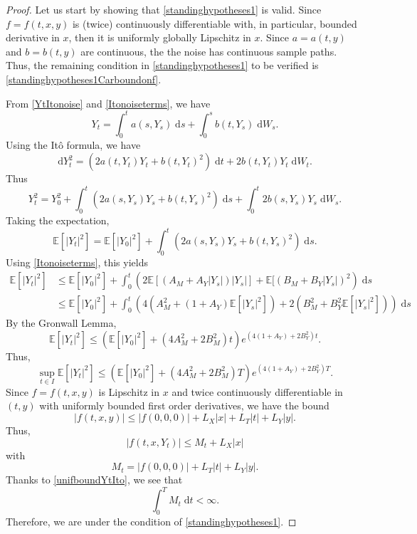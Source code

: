 \documentclass[reqno,12pt]{amsart}
\theoremstyle{plain}%
\theoremstyle{definition}
\begin{document}
\begin{proof}
    Let us start by showing that \cref{standinghypotheses1} is valid. Since $f=f(t, x, y)$ is (twice) continuously differentiable with, in particular, bounded derivative in $x$, then it is uniformly globally Lipschitz in $x$. Since $a=a(t, y)$ and $b=b(t, y)$ are continuous, the the noise has continuous sample paths. Thus, the remaining condition in \cref{standinghypotheses1} to be verified is \eqref{standinghypotheses1Carboundonf}.

    From \eqref{YtItonoise} and \eqref{Itonoiseterms}, we have
    \[
        Y_t = \int_0^t a(s, Y_s)\;\mathrm{d}s + \int_0^s b(t, Y_s)\;\mathrm{d}W_s.
    \]
    Using the It\^o formula, we have
    \[
        \mathrm{d}Y_t^2 = \left(2a(t, Y_t) Y_t  + b(t, Y_t)^2 \right) \;\mathrm{d}t + 2b(t, Y_t) Y_t\;\mathrm{d}W_t.
    \]
    Thus
    \[
        Y_t^2 = Y_0^2 + \int_0^t \left(2a(s, Y_s) Y_s  + b(t, Y_s)^2 \right) \;\mathrm{d}s + \int_0^t 2b(s, Y_s) Y_s\;\mathrm{d}W_s.
    \]
    Taking the expectation,
    \[
        \mathbb{E}[|Y_t|^2] = \mathbb{E}[|Y_0|^2] + \int_0^t \left(2a(s, Y_s) Y_s  + b(t, Y_s)^2 \right) \;\mathrm{d}s.
    \]
    Using \eqref{Itonoiseterms}, this yields
    \begin{align*}
        \mathbb{E}[|Y_t|^2] & \leq \mathbb{E}[|Y_0|^2] + \int_0^t \left(2\mathbb{E}[(A_M + A_Y |Y_s|) |Y_s|]  + \mathbb{E}[(B_M + B_Y|Y_s|)^2 \right) \;\mathrm{d}s \\
        & \leq \mathbb{E}[|Y_0|^2] + \int_0^t \left(4(A_M^2 + (1 + A_Y) \mathbb{E}[|Y_s|^2])  + 2(B_M^2 + B_Y^2\mathbb{E}[|Y_s|^2]) \right) \;\mathrm{d}s
    \end{align*}
    By the Gronwall Lemma,
    \[
        \mathbb{E}[|Y_t|^2] \leq \left( \mathbb{E}[|Y_0|^2] + (4A_M^2 + 2B_M^2)t\right)e^{(4(1 + A_Y) + 2B_Y^2)t}.
    \]
    Thus,
    \begin{equation}
        \label{unifboundYtIto}
        \sup_{t\in I}\mathbb{E}[|Y_t|^2] \leq \left( \mathbb{E}[|Y_0|^2] + (4A_M^2 + 2B_M^2)T\right)e^{(4(1 + A_Y) + 2B_Y^2)T}.
    \end{equation}
    Since $f=f(t, x, y)$ is Lipschitz in $x$ and twice continuously differentiable in $(t, y)$ with uniformly bounded first order derivatives, we have the bound
    \[
        |f(t, x, y)| \leq |f(0, 0, 0)| + L_X|x| + L_T|t| + L_Y|y|.
    \]
    Thus,
    \[
        |f(t, x, Y_t)| \leq M_t + L_X|x|
    \]
    with
    \[
        M_t = |f(0, 0, 0)| + L_T|t| + L_Y|y|.
    \]
    Thanks to \eqref{unifboundYtIto}, we see that
    \[
        \int_0^T M_t\;\mathrm{d}t < \infty.
    \]
    Therefore, we are under the condition of \eqref{standinghypotheses1}.


\end{proof}
\end{document}
